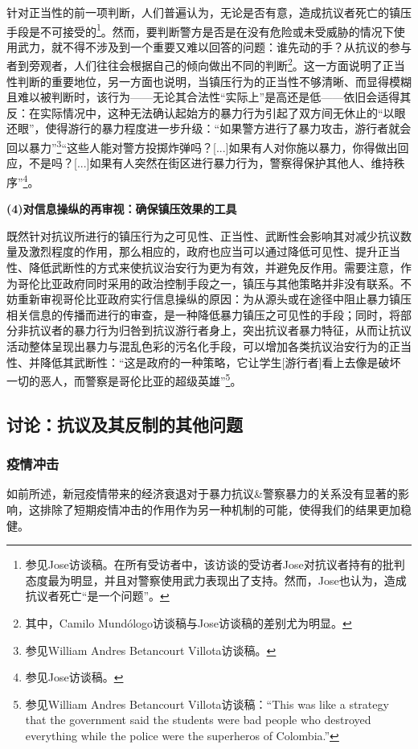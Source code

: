 \documentclass{phyasgn}\usepackage{nag}
\begin{document}
\par 针对正当性的前一项判断，人们普遍认为，无论是否有意，造成抗议者死亡的镇压手段是不可接受的\footnote[75]{参见Jose访谈稿。在所有受访者中，该访谈的受访者Jose对抗议者持有的批判态度最为明显，并且对警察使用武力表现出了支持。然而，Jose也认为，造成抗议者死亡“是一个问题”。}。然而，要判断警方是否是在没有危险或未受威胁的情况下使用武力，就不得不涉及到一个重要又难以回答的问题：谁先动的手？从抗议的参与者到旁观者，人们往往会根据自己的倾向做出不同的判断\footnote[76]{其中，Camilo Mundólogo访谈稿与Jose访谈稿的差别尤为明显。}。这一方面说明了正当性判断的重要地位，另一方面也说明，当镇压行为的正当性不够清晰、而显得模糊且难以被判断时，该行为——无论其合法性“实际上”是高还是低——依旧会适得其反：在实际情况中，这种无法确认起始方的暴力行为引起了双方间无休止的“以眼还眼”，使得游行的暴力程度进一步升级：“如果警方进行了暴力攻击，游行者就会回以暴力”\footnote[77]{参见William Andres Betancourt Villota访谈稿。}“这些人能对警方投掷炸弹吗？[...]如果有人对你施以暴力，你得做出回应，不是吗？[...]如果有人突然在街区进行暴力行为，警察得保护其他人、维持秩序”\footnote[78]{参见Jose访谈稿。}。
\par \textbf{(4)对信息操纵的再审视：确保镇压效果的工具}
\par 既然针对抗议所进行的镇压行为之可见性、正当性、武断性会影响其对减少抗议数量及激烈程度的作用，那么相应的，政府也应当可以通过降低可见性、提升正当性、降低武断性的方式来使抗议治安行为更为有效，并避免反作用。需要注意，作为哥伦比亚政府同时采用的政治控制手段之一，镇压与其他策略并非没有联系。不妨重新审视哥伦比亚政府实行信息操纵的原因：为从源头或在途径中阻止暴力镇压相关信息的传播而进行的审查，是一种降低暴力镇压之可见性的手段；同时，将部分非抗议者的暴力行为归咎到抗议游行者身上，突出抗议者暴力特征，从而让抗议活动整体呈现出暴力与混乱色彩的污名化手段，可以增加各类抗议治安行为的正当性、并降低其武断性：“这是政府的一种策略，它让学生[游行者]看上去像是破坏一切的恶人，而警察是哥伦比亚的超级英雄”\footnote[79]{参见William Andres Betancourt Villota访谈稿：“This was like a strategy that the government said the students were bad people who destroyed everything while the police were the superheros of Colombia.”}。
\subsection{讨论：抗议及其反制的其他问题}
\subsubsection{疫情冲击}
如前所述，新冠疫情带来的经济衰退对于暴力抗议\&警察暴力的关系没有显著的影响，这排除了短期疫情冲击的作用作为另一种机制的可能，使得我们的结果更加稳健。
\end{document}
